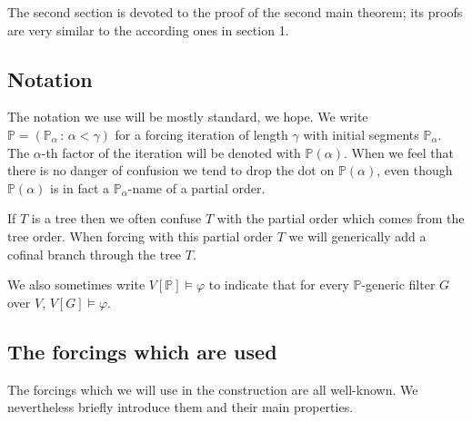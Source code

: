 \documentclass[a4paper,12pt]{article}
\newcommand{\forceP}{\mathbb{P}}
\begin{document}
The second section is devoted to the proof of the second main theorem; its proofs are very similar to the according ones in section 1. 

\subsection{Notation}
The notation we use will be mostly standard, we hope. We write $\forceP=(\forceP_{\alpha} \, : \, \alpha < \gamma)$ for a forcing iteration of length $\gamma$ with initial segments $\forceP_{\alpha}$. The $\alpha$-th factor of the iteration will be denoted with $\forceP(\alpha)$. When we feel that there is no danger of confusion we tend to drop the dot on $\forceP(\alpha)$, even though $\forceP(\alpha)$ is in fact a $\forceP_{\alpha}$-name of a partial order. 

If $T$ is a tree then we often confuse $T$ with the partial order which comes from the tree order. When forcing with this partial order $T$ we will generically add a cofinal branch through the tree $T$.

We also sometimes write $V[\forceP]\models \varphi$ to indicate that for every $\forceP$-generic filter $G$ over $V$, $V[G] \models \varphi$.

\subsection{The forcings which are used}
The forcings which we will use in the construction are all well-known. We nevertheless briefly introduce them and their main properties. 
\end{document}
